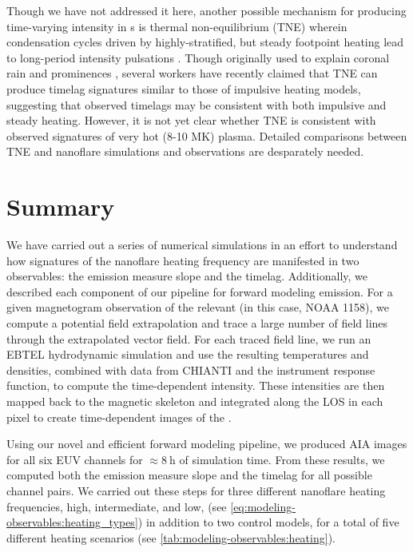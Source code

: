 Though we have not addressed it here, another possible mechanism for producing time-varying intensity in \AR s is thermal non-equilibrium (TNE) wherein condensation cycles driven by highly-stratified, but steady footpoint heating lead to long-period intensity pulsations \citep{kuin_thermal_1982}. Though originally used to explain coronal rain \citep{antolin_coronal_2010,antolin_multithermal_2015,auchere_coronal_2018} and prominences \citep{antiochos_model_1991}, several workers \citep{mok_three-dimensional_2016,winebarger_investigation_2016,froment_long-period_2017,winebarger_identifying_2018,froment_occurrence_2018} have recently claimed that TNE can produce timelag signatures similar to those of impulsive heating models, suggesting that observed timelags may be consistent with both impulsive and steady heating. However, it is not yet clear whether TNE is consistent with observed signatures of very hot (8-10 MK) plasma. Detailed comparisons between TNE and nanoflare simulations and observations are desparately needed.

\section{Summary}\label{sec:modeling-observables:conclusions}

We have carried out a series of numerical simulations in an effort to understand how signatures of the nanoflare heating frequency are manifested in two observables: the emission measure slope and the timelag. Additionally, we described each component of our pipeline for forward modeling \AR{} emission. For a given magnetogram observation of the relevant \AR{} (in this case, NOAA 1158), we compute a potential field extrapolation and trace a large number of field lines through the extrapolated vector field. For each traced field line, we run an EBTEL hydrodynamic simulation and use the resulting temperatures and densities, combined with data from CHIANTI and the instrument response function, to compute the time-dependent intensity. These intensities are then mapped back to the magnetic skeleton and integrated along the LOS in each pixel to create time-dependent images of the \AR{}.

Using our novel and efficient forward modeling pipeline, we produced AIA images for all six EUV channels for $\approx\SI{8}{\hour}$ of simulation time. From these results, we computed both the emission measure slope and the timelag for all possible channel pairs. We carried out these steps for three different nanoflare heating frequencies, high, intermediate, and low, (see \autoref{eq:modeling-observables:heating_types}) in addition to two control models, for a total of five different heating scenarios (see \autoref{tab:modeling-observables:heating}).

